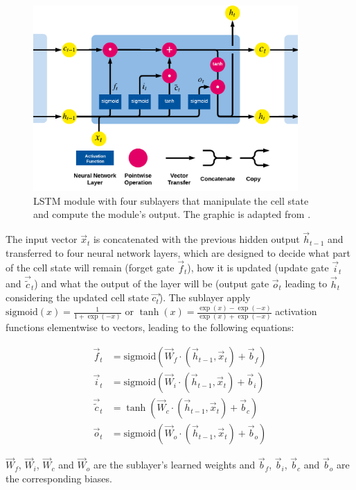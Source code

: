 \begin{figure}[htbp!]
	\centering
	\includegraphics[width=0.9\textwidth]{figures/lstm-module}
	\caption[Structure of an LSTM module]{LSTM module with four sublayers that manipulate the cell state and compute the module's output. The graphic is adapted from \cite{lstm-blog}.}
	\label{fig:lstm-module}
\end{figure}

The input vector $\vec{x}_t$ is concatenated with the previous hidden output $\vec{h}_{t-1}$ and transferred to four neural network layers, which are designed to decide what part of the cell state will remain (forget gate $\vec{f}_t$), how it is updated (update gate $\vec{i}_t$ and $\vec{\tilde{c}}_t$) and what the output of the layer will be (output gate $\vec{o}_t$ leading to $\vec{h}_t$ considering the updated cell state $\vec{c_t}$).
The sublayer apply $\text{sigmoid}(x) = \frac{1}{1+\exp({-x})}$ or $\tanh(x) = \frac{\exp({x}) - \exp({-x})}{\exp({x}) + \exp({-x})}$ activation functions elementwise to vectors, leading to the following equations:

\begin{align*}
\vec{f}_t & = \text{sigmoid}(\vec{W}_f \cdot (\vec{h}_{t-1}, \vec{x}_t) + \vec{b}_f) \\
\vec{i}_t & =  \text{sigmoid} (\vec{W}_i \cdot (\vec{h}_{t-1}, \vec{x}_t) + \vec{b}_i) \\
\vec{\tilde{c}}_t & = \tanh (\vec{W}_c \cdot (\vec{h}_{t-1}, \vec{x}_t) + \vec{b}_c) \\
\vec{o}_t & =  \text{sigmoid} (\vec{W}_o \cdot (\vec{h}_{t-1}, \vec{x}_t) + \vec{b}_o)
\end{align*}

$\vec{W}_f$, $\vec{W}_i$, $\vec{W}_c$ and $\vec{W}_o$ are the sublayer's learned weights and $\vec{b}_f$, $\vec{b}_i$, $\vec{b}_c$ and $\vec{b}_o$ are the corresponding biases.


